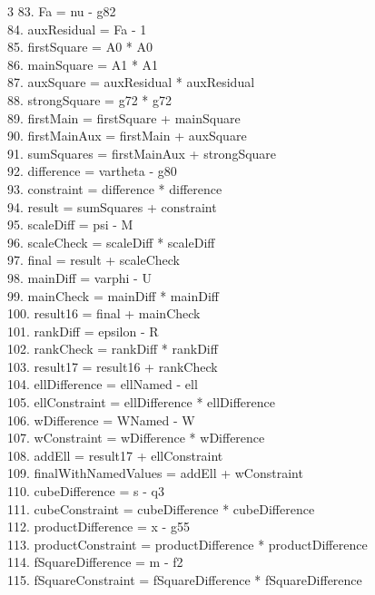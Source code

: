 \documentclass[10pt]{article}
\begin{document}
\begin{multicols}{3}
83. Fa = nu - g82\\
84. auxResidual = Fa - 1\\
85. firstSquare = A0 * A0\\
86. mainSquare = A1 * A1\\
87. auxSquare = auxResidual * auxResidual\\
88. strongSquare = g72 * g72\\
89. firstMain = firstSquare + mainSquare\\
90. firstMainAux = firstMain + auxSquare\\
91. sumSquares = firstMainAux + strongSquare\\
92. difference = vartheta - g80\\
93. constraint = difference * difference\\
94. result = sumSquares + constraint\\
95. scaleDiff = psi - M\\
96. scaleCheck = scaleDiff * scaleDiff\\
97. final = result + scaleCheck\\
98. mainDiff = varphi - U\\
99. mainCheck = mainDiff * mainDiff\\
100. result16 = final + mainCheck\\
101. rankDiff = epsilon - R\\
102. rankCheck = rankDiff * rankDiff\\
103. result17 = result16 + rankCheck\\
104. ellDifference = ellNamed - ell\\
105. ellConstraint = ellDifference * ellDifference\\
106. wDifference = WNamed - W\\
107. wConstraint = wDifference * wDifference\\
108. addEll = result17 + ellConstraint\\
109. finalWithNamedValues = addEll + wConstraint\\
110. cubeDifference = s - q3\\
111. cubeConstraint = cubeDifference * cubeDifference\\
112. productDifference = x - g55\\
113. productConstraint = productDifference * productDifference\\
114. fSquareDifference = m - f2\\
115. fSquareConstraint = fSquareDifference * fSquareDifference\\

\end{multicols}
\end{document}
